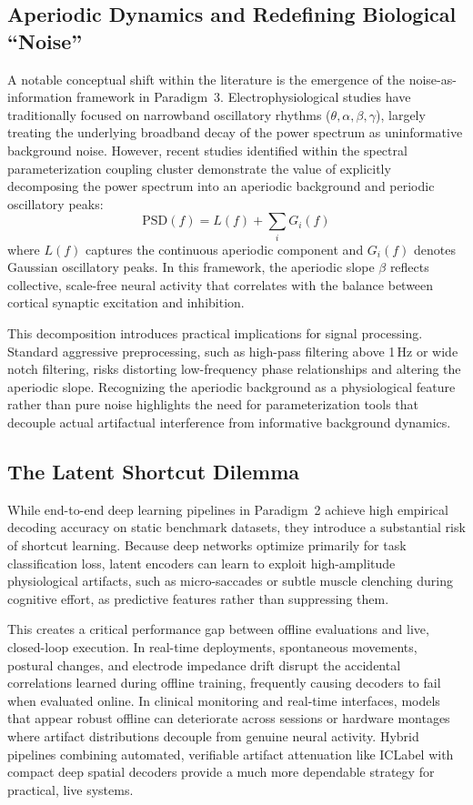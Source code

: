 \documentclass[preprint,12pt]{elsarticle}
\begin{document}
\subsection{Aperiodic Dynamics and Redefining Biological ``Noise''}
A notable conceptual shift within the literature is the emergence of the noise-as-information framework in Paradigm~3. Electrophysiological studies have traditionally focused on narrowband oscillatory rhythms ($\theta, \alpha, \beta, \gamma$), largely treating the underlying broadband decay of the power spectrum as uninformative background noise. However, recent studies identified within the spectral parameterization coupling cluster \cite{gerster2022separating, porcaro2026quantifying} demonstrate the value of explicitly decomposing the power spectrum into an aperiodic background and periodic oscillatory peaks:
\begin{equation}
\text{PSD}(f) = L(f) + \sum_{i} G_i(f)
\end{equation}
where $L(f)$ captures the continuous aperiodic component and $G_i(f)$ denotes Gaussian oscillatory peaks. In this framework, the aperiodic slope $\beta$ reflects collective, scale-free neural activity that correlates with the balance between cortical synaptic excitation and inhibition. 

This decomposition introduces practical implications for signal processing. Standard aggressive preprocessing, such as high-pass filtering above 1\,Hz or wide notch filtering, risks distorting low-frequency phase relationships and altering the aperiodic slope. Recognizing the aperiodic background as a physiological feature rather than pure noise highlights the need for parameterization tools that decouple actual artifactual interference from informative background dynamics.

\subsection{The Latent Shortcut Dilemma}
While end-to-end deep learning pipelines in Paradigm~2 achieve high empirical decoding accuracy on static benchmark datasets, they introduce a substantial risk of shortcut learning. Because deep networks optimize primarily for task classification loss, latent encoders can learn to exploit high-amplitude physiological artifacts, such as micro-saccades or subtle muscle clenching during cognitive effort, as predictive features rather than suppressing them. 

This creates a critical performance gap between offline evaluations and live, closed-loop execution. In real-time deployments, spontaneous movements, postural changes, and electrode impedance drift disrupt the accidental correlations learned during offline training, frequently causing decoders to fail when evaluated online. In clinical monitoring and real-time interfaces, models that appear robust offline can deteriorate across sessions or hardware montages where artifact distributions decouple from genuine neural activity. Hybrid pipelines combining automated, verifiable artifact attenuation like ICLabel \cite{pion2019iclabel} with compact deep spatial decoders provide a much more dependable strategy for practical, live systems.
\end{document}
